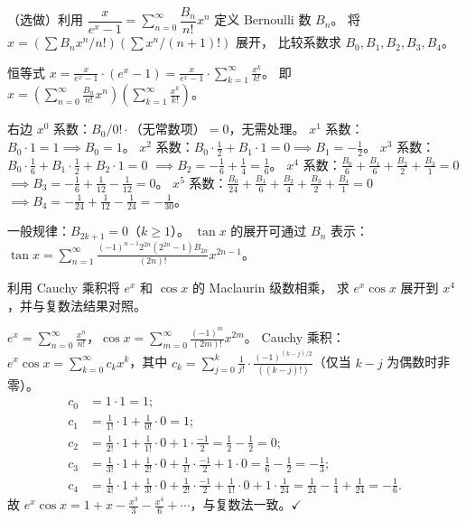 \documentclass{ctexart}
\begin{document}
\begin{exercise}
  （选做）利用 $\dfrac{x}{e^x - 1} = \sum_{n=0}^\infty \dfrac{B_n}{n!}x^n$
  定义 Bernoulli 数 $B_n$。
  将 $x = \left(\sum B_n x^n/n!\right)\!\left(\sum x^n/(n+1)!\right)$ 展开，
  比较系数求 $B_0, B_1, B_2, B_3, B_4$。
\end{exercise}

\begin{solution}
  恒等式 $x = \frac{x}{e^x-1}\cdot(e^x-1) = \frac{x}{e^x-1}\cdot\sum_{k=1}^\infty\frac{x^k}{k!}$。
  即 $x = \left(\sum_{n=0}^\infty\frac{B_n}{n!}x^n\right)\!\left(\sum_{k=1}^\infty\frac{x^k}{k!}\right)$。

  右边 $x^0$ 系数：$B_0/0! \cdot$（无常数项）$= 0$，无需处理。
  $x^1$ 系数：$B_0 \cdot 1 = 1 \implies B_0 = 1$。
  $x^2$ 系数：$B_0 \cdot \frac{1}{2} + B_1 \cdot 1 = 0 \implies B_1 = -\frac{1}{2}$。
  $x^3$ 系数：$B_0 \cdot \frac{1}{6} + B_1 \cdot \frac{1}{2} + B_2 \cdot 1 = 0$
  $\implies B_2 = -\frac{1}{6}+\frac{1}{4} = \frac{1}{6}$。
  $x^4$ 系数：$\frac{B_0}{6}+\frac{B_1}{6}+\frac{B_2}{2}+\frac{B_3}{1}=0$
  $\implies B_3 = -\frac{1}{6}+\frac{1}{12}-\frac{1}{12} = 0$。
  $x^5$ 系数：$\frac{B_0}{24}+\frac{B_1}{6}+\frac{B_2}{4}+\frac{B_3}{2}+\frac{B_4}{1}=0$
  $\implies B_4 = -\frac{1}{24}+\frac{1}{12}-\frac{1}{24} = -\frac{1}{30}$。

  一般规律：$B_{2k+1} = 0$（$k \ge 1$）。
  $\tan x$ 的展开可通过 $B_n$ 表示：
  $\tan x = \sum_{n=1}^\infty \frac{(-1)^{n-1}2^{2n}(2^{2n}-1)B_{2n}}{(2n)!}x^{2n-1}$。
\end{solution}

\begin{exercise}
  利用 Cauchy 乘积将 $e^x$ 和 $\cos x$ 的 Maclaurin 级数相乘，
  求 $e^x\cos x$ 展开到 $x^4$，并与复数法结果对照。
\end{exercise}

\begin{solution}
  $e^x = \sum_{n=0}^\infty \frac{x^n}{n!}$，$\cos x = \sum_{m=0}^\infty \frac{(-1)^m}{(2m)!}x^{2m}$。
  Cauchy 乘积：$e^x\cos x = \sum_{k=0}^\infty c_k x^k$，其中
  $c_k = \sum_{j=0}^{k} \frac{1}{j!}\cdot\frac{(-1)^{(k-j)/2}}{((k-j)!)}$（仅当 $k-j$ 为偶数时非零）。
  \begin{align*}
    c_0 &= 1 \cdot 1 = 1; \\
    c_1 &= \frac{1}{1!}\cdot 1 + \frac{1}{0!}\cdot 0 = 1; \\
    c_2 &= \frac{1}{2!}\cdot 1 + \frac{1}{1!}\cdot 0 + 1\cdot\frac{-1}{2} = \frac{1}{2} - \frac{1}{2} = 0; \\
    c_3 &= \frac{1}{3!}\cdot 1 + \frac{1}{2!}\cdot 0 + \frac{1}{1!}\cdot\frac{-1}{2} + 1\cdot 0 = \frac{1}{6} - \frac{1}{2} = -\frac{1}{3}; \\
    c_4 &= \frac{1}{4!}\cdot 1 + \frac{1}{3!}\cdot 0 + \frac{1}{2!}\cdot\frac{-1}{2} + \frac{1}{1!}\cdot 0 + 1\cdot\frac{1}{24}
    = \frac{1}{24} - \frac{1}{4} + \frac{1}{24} = -\frac{1}{6}.
  \end{align*}
  故 $e^x\cos x = 1 + x - \frac{x^3}{3} - \frac{x^4}{6} + \cdots$，与复数法一致。$\checkmark$
\end{solution}
\end{document}
